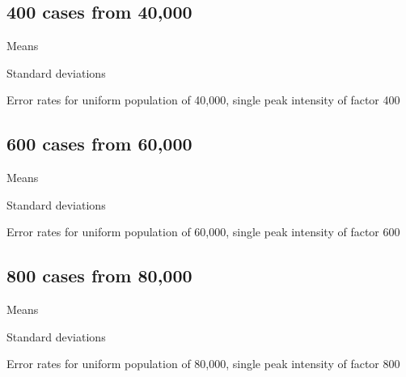 \subsection{400 cases from 40,000}
\begin{table}[H]
\centering
\scriptsize

    \begin{subtable}{0.5\textwidth}
    
    \caption{Means} 
    \end{subtable}%
    \begin{subtable}{0.5\textwidth}
    
    \caption{Standard deviations} 
    \end{subtable}

\caption{Error rates for uniform population of 40,000, single peak intensity of factor 400}
\label{tbl:mean_error_rates:unif40k_400_1_1h}
\end{table}

\subsection{600 cases from 60,000}
\begin{table}[H]
\centering
\scriptsize

    \begin{subtable}{0.5\textwidth}
    
    \caption{Means} 
    \end{subtable}%
    \begin{subtable}{0.5\textwidth}
    
    \caption{Standard deviations} 
    \end{subtable}

\caption{Error rates for uniform population of 60,000, single peak intensity of factor 600}
\label{tbl:mean_error_rates:unif60k_600_1_1h}
\end{table}

\subsection{800 cases from 80,000}
\begin{table}[H]
\centering
\scriptsize

    \begin{subtable}{0.5\textwidth}
    
    \caption{Means} 
    \end{subtable}%
    \begin{subtable}{0.5\textwidth}
    
    \caption{Standard deviations} 
    \end{subtable}

\caption{Error rates for uniform population of 80,000, single peak intensity of factor 800}
\label{tbl:mean_error_rates:unif80k_800_1_1h}
\end{table}

